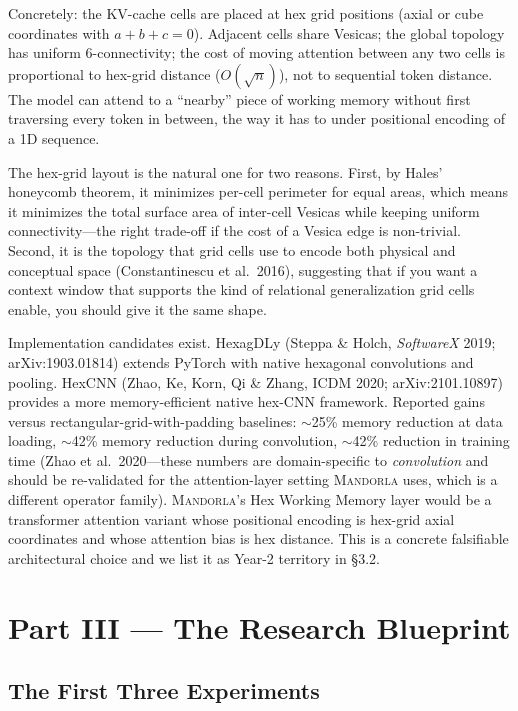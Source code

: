 \documentclass[11pt,a4paper]{article}
\begin{document}
Concretely: the KV-cache cells are placed at hex grid positions (axial or cube coordinates with $a + b + c = 0$). Adjacent cells share Vesicas; the global topology has uniform 6-connectivity; the cost of moving attention between any two cells is proportional to hex-grid distance ($O(\sqrt{n})$), not to sequential token distance. The model can attend to a ``nearby'' piece of working memory without first traversing every token in between, the way it has to under positional encoding of a 1D sequence.

The hex-grid layout is the natural one for two reasons. First, by Hales' honeycomb theorem, it minimizes per-cell perimeter for equal areas, which means it minimizes the total surface area of inter-cell Vesicas while keeping uniform connectivity---the right trade-off if the cost of a Vesica edge is non-trivial. Second, it is the topology that grid cells use to encode both physical and conceptual space (Constantinescu et al.\ 2016), suggesting that if you want a context window that supports the kind of relational generalization grid cells enable, you should give it the same shape.

Implementation candidates exist. HexagDLy (Steppa \& Holch, \emph{SoftwareX} 2019; arXiv:1903.01814) extends PyTorch with native hexagonal convolutions and pooling. HexCNN (Zhao, Ke, Korn, Qi \& Zhang, ICDM 2020; arXiv:2101.10897) provides a more memory-efficient native hex-CNN framework. Reported gains versus rectangular-grid-with-padding baselines: $\sim$25\% memory reduction at data loading, $\sim$42\% memory reduction during convolution, $\sim$42\% reduction in training time (Zhao et al.\ 2020---these numbers are domain-specific to \emph{convolution} and should be re-validated for the attention-layer setting \textsc{Mandorla} uses, which is a different operator family). \textsc{Mandorla}'s Hex Working Memory layer would be a transformer attention variant whose positional encoding is hex-grid axial coordinates and whose attention bias is hex distance. This is a concrete falsifiable architectural choice and we list it as Year-2 territory in \S 3.2.

\section{Part III --- The Research Blueprint}

\subsection{The First Three Experiments}
\end{document}
